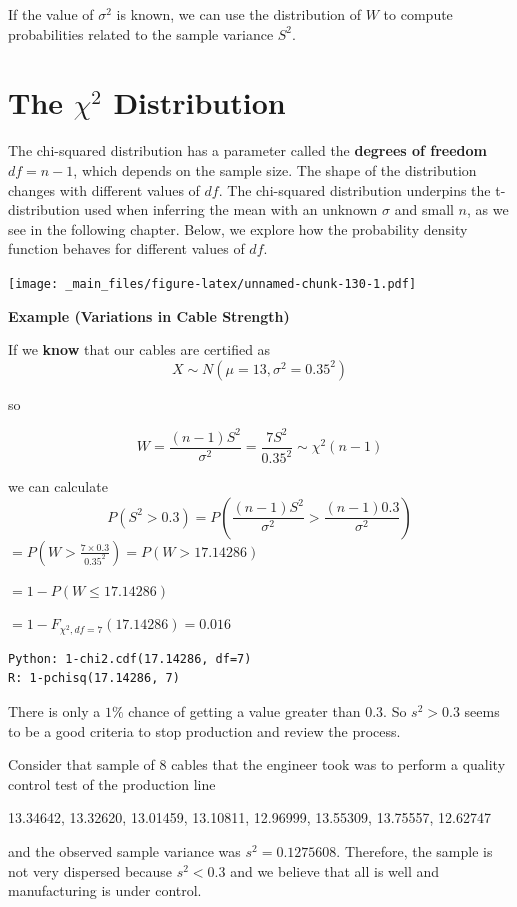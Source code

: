 \documentclass[
]{book}
\begin{document}
If the value of \(\sigma^2\) is known, we can use the distribution of \(W\) to compute probabilities related to the sample variance \(S^2\).

\hypertarget{the-chi2-distribution}{%
\section{\texorpdfstring{The \(\chi^2\) Distribution}{The \textbackslash chi\^{}2 Distribution}}\label{the-chi2-distribution}}

The chi-squared distribution has a parameter called the \textbf{degrees of freedom} \(df = n - 1\), which depends on the sample size. The shape of the distribution changes with different values of \(df\). The chi-squared distribution underpins the t-distribution used when inferring the mean with an unknown \(\sigma\) and small \(n\), as we see in the following chapter. Below, we explore how the probability density function behaves for different values of \(df\).

\texttt{[image: \_main\_files/figure-latex/unnamed-chunk-130-1.pdf]}

\textbf{Example (Variations in Cable Strength)}

If we \textbf{know} that our cables are certified as
\[X \sim N(\mu=13, \sigma^2=0.35^2)\]

so

\[W=\frac{(n-1)S^2}{\sigma^2}= \frac{7S^2}{0.35^2} \sim \chi^2(n-1)\]

we can calculate \[P(S^2 > 0.3)=P(\frac{(n-1)S^2}{\sigma^2} > \frac{(n-1)0.3}{\sigma^2 } )\]
\(=P(W > \frac{7\times0.3}{0.35^2})=P(W > 17.14286)\)

\(=1-P(W \leq 17.14286)\)

\(= 1- F_{\chi^2,df=7}(17.14286)=0.016\)

\begin{verbatim}
Python: 1-chi2.cdf(17.14286, df=7)
R: 1-pchisq(17.14286, 7)
\end{verbatim}

There is only a \(1\%\) chance of getting a value greater than \(0.3\). So \(s^2>0.3\) seems to be a good criteria to stop production and review the process.

Consider that sample of \(8\) cables that the engineer took was to perform a quality control test of the production line

13.34642, 13.32620, 13.01459, 13.10811, 12.96999, 13.55309, 13.75557, 12.62747

and the observed sample variance was \(s^2=0.1275608\). Therefore, the sample is not very dispersed because \(s^2 < 0.3\) and we believe that all is well and manufacturing is under control.
\end{document}

